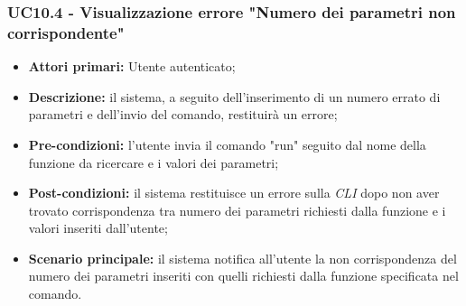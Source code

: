 \subsubsection{UC10.4 - Visualizzazione errore "Numero dei parametri non corrispondente"}
\begin{itemize}
	\item \textbf{Attori primari:} Utente autenticato;
	\item \textbf{Descrizione:} il sistema, a seguito dell'inserimento di un numero errato di parametri e dell'invio del comando, restituirà un errore; 
	\item \textbf{Pre-condizioni:} l'utente invia il comando "run" seguito dal nome della funzione da ricercare e i valori dei parametri;
	\item \textbf{Post-condizioni:} il sistema restituisce un errore sulla \textit{CLI\glo} dopo non aver trovato corrispondenza tra numero dei parametri richiesti dalla funzione e i valori inseriti dall'utente;
	\item \textbf{Scenario principale:} il sistema notifica all'utente la non corrispondenza del numero dei parametri inseriti con quelli richiesti dalla funzione specificata nel comando.
\end{itemize}

